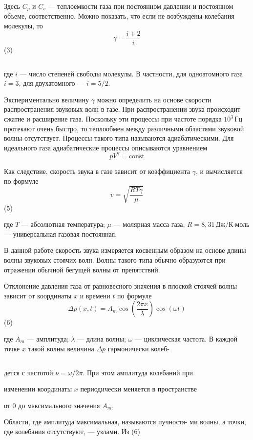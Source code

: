 \documentclass[a4paper]{article}
\begin{document}
Здесь $C_p$ и $C_v$ — теплоемкости газа при постоянном давлении и постоянном объеме, соответственно. Можно показать, что если не возбуждены колебания молекулы, то
\[
\gamma = \frac{i + 2}{i}
\]
(3)

\subsection*{}
где $i$ — число степеней свободы молекулы. В частности, для одноатомного газа $i = 3$, для двухатомного — $i = 5/2$.

Экспериментально величину $\gamma$ можно определить на основе скорости распространения звуковых волн в газе. При распространении звука происходит сжатие и расширение газа. Поскольку эти процессы при частоте порядка $10^3 \, \text{Гц}$ протекают очень быстро, то теплообмен между различными областями звуковой волны отсутствует. Процессы такого типа называются адиабатическими. Для идеального газа адиабатические процессы описываются уравнением
\[
pV^\gamma = \text{const}
\]

Как следствие, скорость звука в газе зависит от коэффициента $\gamma$, и вычисляется по формуле
\[
v = \sqrt{\frac{RT\gamma}{\mu}}
\]
(5)

где $T$ — абсолютная температура; $\mu$ — молярная масса газа, $R = 8,31 \, \text{Дж/К·моль}$ — универсальная газовая постоянная.

В данной работе скорость звука измеряется косвенным образом на основе длины волны звуковых стоячих волн. Волны такого типа обычно образуются при отражении обычной бегущей волны от препятствий.

Отклонение давления газа от равновесного значения в плоской стоячей волны зависит от координаты $x$ и времени $t$ по формуле
\[
\Delta p(x,t) = A_m \cos \left( \frac{2\pi x}{\lambda} \right) \cos (\omega t)
\]
(6)

где $A_m$ — амплитуда; $\lambda$ — длина волны; $\omega$ — циклическая частота. В каждой точке $x$ такой волны величина $\Delta p$ гармонически колеб-

\subsection*{}
дется с частотой $\nu = \omega/2\pi$. При этом амплитуда колебаний при

изменении координаты $x$ периодически меняется в пространстве

от 0 до максимального значения $A_m$.

Области, где амплитуда максимальная, называются пучностя-
ми волны, а точки, где колебания отсутствуют, — узлами. Из (6)
\end{document}
